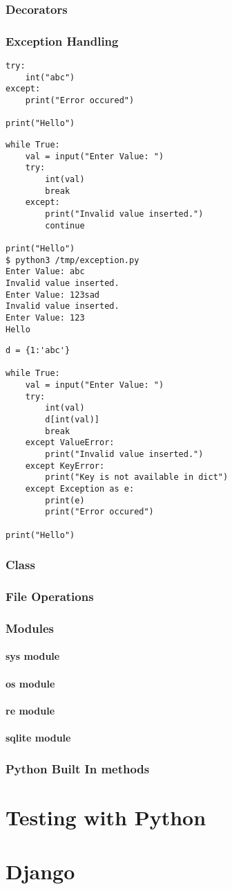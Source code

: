 \documentclass[letterpaper,12pt]{book}
\begin{document}
\section{Decorators}
\section{Exception Handling}
\begin{verbatim}
try:
    int("abc")
except:
    print("Error occured")

print("Hello")

\end{verbatim}
\begin{verbatim}
while True:
    val = input("Enter Value: ")
    try:
        int(val)
        break
    except:
        print("Invalid value inserted.")
        continue

print("Hello")
$ python3 /tmp/exception.py
Enter Value: abc
Invalid value inserted.
Enter Value: 123sad
Invalid value inserted.
Enter Value: 123
Hello
\end{verbatim}
\begin{verbatim}
d = {1:'abc'}

while True:
    val = input("Enter Value: ")
    try:
        int(val)
        d[int(val)]
        break
    except ValueError:
        print("Invalid value inserted.")
    except KeyError:
        print("Key is not available in dict")
    except Exception as e:
        print(e)
        print("Error occured")

print("Hello")
\end{verbatim}
\section{Class}
\section{File Operations}
\section{Modules}
\subsection{sys module}
\subsection{os module}
\subsection{re module}
\subsection{sqlite module}
\section{Python Built In methods}
\part{Testing with Python}
\part{Django}
\end{document}
